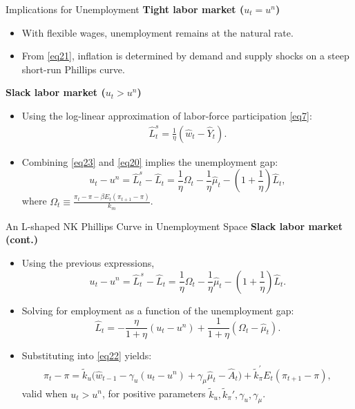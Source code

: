 \documentclass[11pt,aspectratio=169]{beamer}
\begin{document}
\begin{frame}{Implications for Unemployment}
\small
\textbf{Tight labor market (\(u_t=u^n\))}
\begin{itemize}
    \item With flexible wages, unemployment remains at the natural rate.
    \item From \eqref{eq21}, inflation is determined by demand and supply shocks on a steep short-run Phillips curve.
\end{itemize}

\vspace{0.3cm}
\textbf{Slack labor market (\(u_t>u^n\))}
\begin{itemize}
    \item Using the log-linear approximation of labor-force participation \eqref{eq7}:
    \begin{align}
        \hat{L}_{t}^{s}=\frac{1}{\eta }(\hat{w}_{t}-\hat{Y}_{t}).
        \label{eq23}
    \end{align}
    \item Combining \eqref{eq23} and \eqref{eq20} implies the unemployment gap:
    \[
    u_t-u^n=\hat L_t^{s}-\hat L_t
    =\frac{1}{\eta }\Omega _{t}-\frac{1}{\eta }\hat{\mu}_{t}
    -\left(1+\frac{1}{\eta}\right)\hat L_t,
    \]
    where \(\Omega _{t}\equiv \frac{\pi _{t}-\pi -\beta E_{t}(\pi _{t+1}-\pi )}{k_{m}}\).
\end{itemize}
\end{frame}

\begin{frame}{An L-shaped NK Phillips Curve in Unemployment Space}
\small
\textbf{Slack labor market (cont.)}
\begin{itemize}
\item Using the previous expressions,
\[
u_t - u^n = \hat{L}_t^{\,s} - \hat{L}_t
= \frac{1}{\eta}\Omega_t - \frac{1}{\eta}\hat{\mu}_t
- \left(1 + \frac{1}{\eta}\right)\hat{L}_t.
\]
\item Solving for employment as a function of the unemployment gap:
\[
\hat{L}_{t}
=-\frac{\eta }{1+\eta }(u_{t}-u^{n})
+\frac{1}{1+\eta }(\Omega_{t}-\hat{\mu}_{t}).
\]
\item Substituting into \eqref{eq22} yields:
\begin{align}
    \pi _{t}-\pi
    =\tilde{k}_{u}\big(\hat{w}_{t-1}-\gamma _{u}(u_{t}-u^{n})
    +\gamma_{\mu}\hat{\mu}_{t}-\hat{A}_{t}\big)
    +\tilde{k}_{\pi }^{\prime }E_{t}(\pi_{t+1}-\pi ),
\label{eq24}
\end{align}
valid when \(u_t>u^n\), for positive parameters \(\tilde k_u,\tilde k_\pi',\gamma_u,\gamma_\mu\).
\end{itemize}
\end{frame}
\end{document}

